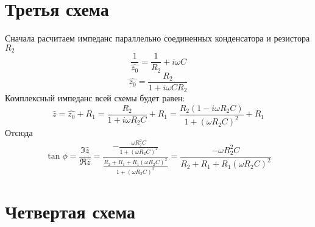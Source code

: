 \section{Третья схема}
\begin{center}

\end{center}
Сначала расчитаем импеданс параллельно соединенных конденсатора и резистора $R_2$
\begin{equation}
	\frac{1}{\hat{z_0}}=\frac{1}{R_2}+i\omega C
\end{equation}
\begin{equation}
	\hat{z_0}=\frac{R_2}{1+i \omega CR_2}
\end{equation}
Комплексный импеданс всей схемы будет равен:
\begin{equation}
	\hat{z}=\hat{z_0}+R_1=\frac{R_2}{1+i \omega R_2C}+R_1=
	\frac{R_2(1-i \omega R_2C)}{1+(\omega R_2C)^2}+R_1
\end{equation}
Отсюда
\begin{equation}
	\tan\phi = \frac{\Im\hat{z}}{\Re\hat{z}}=
	\frac{
		-\frac{\omega R_2^2C}{1+(\omega R_2C)^2}
	}{
		\frac{R_2+R_1+R_1(\omega R_2C)^2}{1+(\omega R_2C)^2}
	}=
	\frac{
		-\omega R_2^2C
	}{
		R_2+R_1+R_1(\omega R_2C)^2
	}	
\end{equation}


\section{Четвертая схема}
	


